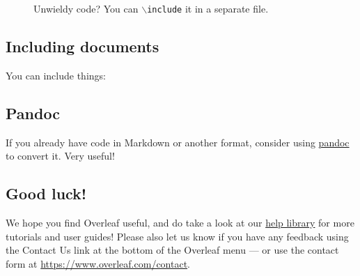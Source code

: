 \documentclass{article}
\begin{document}
\begin{figure}
    \centering
    
    \caption{Unwieldy code? You can \texttt{$\backslash$include} it in a separate file. }
    \label{fig:tikz2}
\end{figure}

\subsection{Including documents}
You can include things:


\subsection{Pandoc}
If you already have code in Markdown or another format, consider using \href{https://pandoc.org/demos.html}{pandoc} to convert it. Very useful!



\subsection{Good luck!}

We hope you find Overleaf useful, and do take a look at our \href{https://www.overleaf.com/learn}{help library} for more tutorials and user guides! Please also let us know if you have any feedback using the Contact Us link at the bottom of the Overleaf menu --- or use the contact form at \url{https://www.overleaf.com/contact}.




\newpage
\printindex
\end{document}
